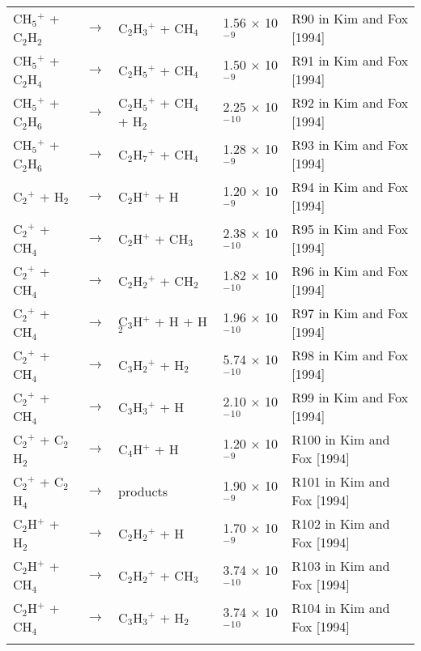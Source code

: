 \documentclass[10pt,a4paper]{jarticle}
\begin{document}
\begin{table}[htb]
{\begin{tabular}{lclll}
 CH$_5$$^+$  + C$_2$H$_2$     & $\rightarrow$ & C$_2$H$_3$$^+$ + CH$_4$           & 1.56 $\times$ 10$^-$$^9$ & R90 in Kim and Fox [1994] \\
 CH$_5$$^+$  + C$_2$H$_4$     & $\rightarrow$ & C$_2$H$_5$$^+$ + CH$_4$           & 1.50 $\times$ 10$^-$$^9$ & R91 in Kim and Fox [1994] \\
 CH$_5$$^+$  + C$_2$H$_6$     & $\rightarrow$ & C$_2$H$_5$$^+$ + CH$_4$ +  H$_2$     & 2.25 $\times$ 10$^-$$^1$$^0$ & R92 in Kim and Fox [1994] \\
 CH$_5$$^+$  + C$_2$H$_6$     & $\rightarrow$ & C$_2$H$_7$$^+$ + CH$_4$           & 1.28 $\times$ 10$^-$$^9$ & R93 in Kim and Fox [1994] \\
 C$_2$$^+$   + H$_2$       & $\rightarrow$ & C$_2$H$^+$  + H             & 1.20 $\times$ 10$^-$$^9$ & R94 in Kim and Fox [1994] \\
 C$_2$$^+$   + CH$_4$      & $\rightarrow$ & C$_2$H$^+$  + CH$_3$           & 2.38 $\times$ 10$^-$$^1$$^0$ & R95 in Kim and Fox [1994] \\
 C$_2$$^+$   + CH$_4$      & $\rightarrow$ & C$_2$H$_2$$^+$ + CH$_2$           & 1.82 $\times$ 10$^-$$^1$$^0$ & R96 in Kim and Fox [1994] \\
 C$_2$$^+$   + CH$_4$      & $\rightarrow$ & C$_3$H$^+$  + H   +  H$_2$     & 1.96 $\times$ 10$^-$$^1$$^0$ & R97 in Kim and Fox [1994] \\
 C$_2$$^+$   + CH$_4$      & $\rightarrow$ & C$_3$H$_2$$^+$ + H$_2$            & 5.74 $\times$ 10$^-$$^1$$^0$ & R98 in Kim and Fox [1994] \\
 C$_2$$^+$   + CH$_4$      & $\rightarrow$ & C$_3$H$_3$$^+$ + H             & 2.10 $\times$ 10$^-$$^1$$^0$ & R99 in Kim and Fox [1994] \\
 C$_2$$^+$   + C$_2$H$_2$     & $\rightarrow$ & C$_4$H$^+$  + H             & 1.20 $\times$ 10$^-$$^9$ & R100 in Kim and Fox [1994] \\
 C$_2$$^+$   + C$_2$H$_4$     & $\rightarrow$ & products              & 1.90 $\times$ 10$^-$$^9$ & R101 in Kim and Fox [1994] \\
 C$_2$H$^+$  + H$_2$       & $\rightarrow$ & C$_2$H$_2$$^+$ + H             & 1.70 $\times$ 10$^-$$^9$ & R102 in Kim and Fox [1994] \\
 C$_2$H$^+$  + CH$_4$      & $\rightarrow$ & C$_2$H$_2$$^+$ + CH$_3$           & 3.74 $\times$ 10$^-$$^1$$^0$ & R103 in Kim and Fox [1994] \\
 C$_2$H$^+$  + CH$_4$      & $\rightarrow$ & C$_3$H$_3$$^+$ + H$_2$            & 3.74 $\times$ 10$^-$$^1$$^0$ & R104 in Kim and Fox [1994] \\
$$
\end{tabular}}
\end{table}
\end{document}
